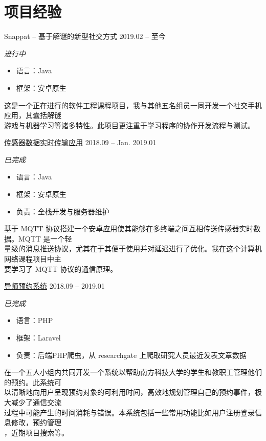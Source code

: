 \documentclass[hidelinks__VERSION__]{adamyi-cv}
\begin{document}
\pagebreak



\section{\heir 项目\heir 经验}

\begin{entrylist}


\entry
{\heir Snappat -- 基于解谜的新型社交方式}
{2019.02 -- \hei 至今}
{\emph{\hei 进行中}
\begin{itemize}
    \item \hei 语言：Java
    \item \hei 框架：安卓原生
\end{itemize}
{\hei
这是一个正在进行的软件工程课程项目，我与其他五名组员一同开发一个社交手机应用，其囊括解谜\\
游戏与机器学习等诸多特性。此项目更注重于学习程序的协作开发流程与测试。
}}


\entry
{\href{https://github.com/hackroid/MqttSensorDemo}{\heir 传感器数据实时传输应用}}
{2018.09 -- Jan. 2019.01}
{\emph{\hei 已完成}
\begin{itemize}
    \item \hei 语言：Java
    \item \hei 框架：安卓原生
    \item \hei 负责：全栈开发与服务器维护
\end{itemize}
{\hei
基于 MQTT 协议搭建一个安卓应用使其能够在多终端之间互相传送传感器实时数据。MQTT 是一个轻\\
量级的消息推送协议，尤其在于其便于使用并对延迟进行了优化。我在这个计算机网络课程项目中主\\
要学习了 MQTT 协议的通信原理。
}}


\entry
{\href{https://github.com/zhaoweizhong/Faculty-Reservation}{\heir 导师预约系统}}
{2018.09 -- 2019.01}
{\emph{\hei 已完成}
\begin{itemize}
    \item \hei 语言：PHP
    \item \hei 框架：Laravel
    \item \hei 负责：后端PHP爬虫，从 researchgate 上爬取研究人员最近发表文章数据
\end{itemize}
{\hei
在一个五人小组内共同开发一个系统以帮助南方科技大学的学生和教职工管理他们的预约。此系统可\\
以清晰地向用户呈现预约对象的可利用时间，高效地规划管理自己的预约事件，极大减少了通信交流\\
过程中可能产生的时间消耗与错误。本系统包括一些常用功能比如用户注册登录信息修改，预约管理\\
，近期项目搜索等。
}}



\end{entrylist}
\end{document}
